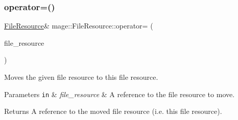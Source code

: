 \subsubsection{\texorpdfstring{operator=()}{operator=()}\hspace{0.1cm}{\footnotesize\ttfamily [2/2]}}
{\footnotesize\ttfamily \hyperlink{classmage_1_1_file_resource}{File\+Resource}\& mage\+::\+File\+Resource\+::operator= (\begin{DoxyParamCaption}\item[{\hyperlink{classmage_1_1_file_resource}{File\+Resource} \&\&}]{file\+\_\+resource }\end{DoxyParamCaption})\hspace{0.3cm}{\ttfamily [delete]}}

Moves the given file resource to this file resource.


\begin{DoxyParams}[1]{Parameters}
\mbox{\tt in}  & {\em file\+\_\+resource} & A reference to the file resource to move. \\
\hline
\end{DoxyParams}
\begin{DoxyReturn}{Returns}
A reference to the moved file resource (i.\+e. this file resource). 
\end{DoxyReturn}
